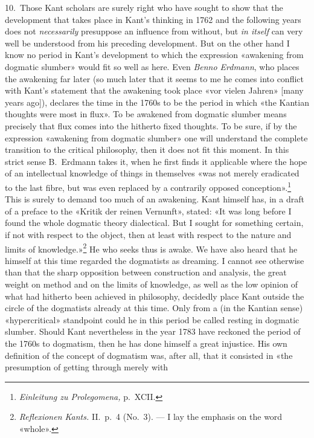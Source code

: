 \documentclass[12pt,a4paper]{article}
\newcommand{\opage}[1]{\marginnote{\footnotesize\textit{[#1]}}}
\begin{document}
10.\ Those Kant scholars are surely right who have sought to show that the
development that takes place in Kant's thinking in 1762 and the following
years does not \emph{necessarily} presuppose an influence from without, but \emph{in
itself} can very well be understood from his preceding development. But on
the other hand I know no period in Kant's development to which the
expression «awakening from dogmatic slumber» would fit so well as here.
Even \emph{Benno Erdmann}, who places the awakening far later (so much later that
it seems to me he comes into conflict with Kant's statement that the
awakening took place «vor vielen Jahren» [many years ago]), declares the
time in the 1760s to be the period in which «the Kantian thoughts were
most in flux». To be awakened from dogmatic slumber means precisely that
flux comes into the hitherto fixed thoughts. To be sure, if by the
expression «awakening from dogmatic slumber» one will understand the
complete transition to the critical philosophy, \opage{23}then it does not fit this
moment. In this strict sense B.\ Erdmann takes it, when he first finds it
applicable where the hope of an intellectual knowledge of things in
themselves «was not merely eradicated to the last fibre, but was even
replaced by a contrarily opposed
conception».\footnote{\textit{Einleitung zu Prolegomena,} p.\ XCII.} This
is surely to demand too much of an awakening. Kant himself has, in a draft
of a preface to the «Kritik der reinen Vernunft», stated: «It was long
before I found the whole dogmatic theory dialectical. But I sought
for something certain, if not with respect to the object, then at least
with respect to the nature and limits of knowledge.»\footnote{\textit{Reflexionen
Kants.} II.\ p.\ 4 (No.\ 3). --- I lay the emphasis on the word «whole».}
He who seeks thus is awake. We have also heard that he himself at this time
regarded the dogmatists as dreaming. I cannot see otherwise than that the
sharp opposition between construction and analysis, the great weight on
method and on the limits of knowledge, as well as the low opinion of what
had hitherto been achieved in philosophy, decidedly place Kant outside the
circle of the dogmatists already at this time. Only from a (in the Kantian
sense) «hypercritical» standpoint could he in this period be called resting
in dogmatic slumber. Should Kant nevertheless in the year 1783 have
reckoned the period of the 1760s to dogmatism, then he has done himself a
great injustice. His own definition of the concept of dogmatism was, after
all, that it consisted in «the presumption of getting through merely with
\end{document}

